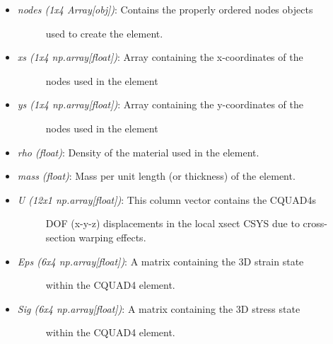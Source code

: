 \documentclass[letterpaper,10pt,english]{sphinxmanual}
\begin{document}
\begin{fulllineitems}
\begin{itemize}
\begin{description}
\end{description}

\item {} \begin{description}
\item[{\emph{nodes (1x4 Array{[}obj{]})}: Contains the properly ordered nodes objects}] \leavevmode
used to create the element.

\end{description}

\item {} \begin{description}
\item[{\emph{xs (1x4 np.array{[}float{]})}: Array containing the x-coordinates of the}] \leavevmode
nodes used in the element

\end{description}

\item {} \begin{description}
\item[{\emph{ys (1x4 np.array{[}float{]})}: Array containing the y-coordinates of the}] \leavevmode
nodes used in the element

\end{description}

\item {} 
\emph{rho (float)}: Density of the material used in the element.

\item {} 
\emph{mass (float)}: Mass per unit length (or thickness) of the element.

\item {} \begin{description}
\item[{\emph{U (12x1 np.array{[}float{]})}: This column vector contains the CQUAD4s}]  DOF (x-y-z) displacements in the local xsect CSYS due to cross-
section warping effects.

\end{description}

\item {} \begin{description}
\item[{\emph{Eps (6x4 np.array{[}float{]})}: A matrix containing the 3D strain state}] \leavevmode
within the CQUAD4 element.

\end{description}

\item {} \begin{description}
\item[{\emph{Sig (6x4 np.array{[}float{]})}: A matrix containing the 3D stress state}] \leavevmode
within the CQUAD4 element.


\end{description}
\end{itemize}
\end{fulllineitems}
\end{document}

